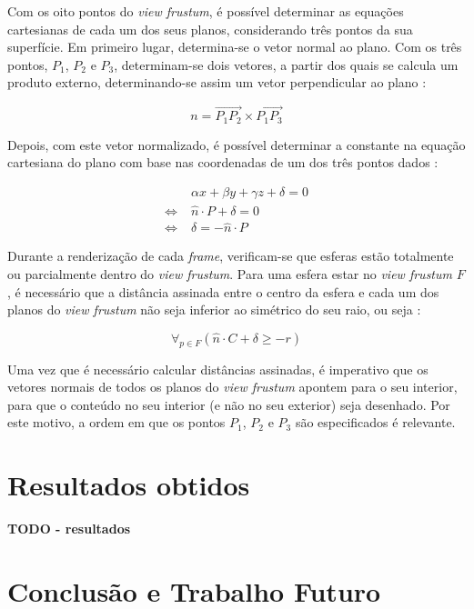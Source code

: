 \documentclass[12pt, a4paper]{article}
\begin{document}
Com os oito pontos do \emph{view frustum}, é possível determinar as equações cartesianas de cada
um dos seus planos, considerando três pontos da sua superfície. Em primeiro lugar, determina-se o
vetor normal ao plano. Com os três pontos, $P_1$, $P_2$ e $P_3$, determinam-se dois vetores, a
partir dos quais se calcula um produto externo, determinando-se assim um vetor perpendicular ao
plano \cite{lighthouse3d-plane}:

$$
n = \overrightarrow{P_1 P_2} \times \overrightarrow{P_1 P_3}
$$

Depois, com este vetor normalizado, é possível determinar a constante na equação cartesiana do plano
com base nas coordenadas de um dos três pontos dados \cite{lighthouse3d-plane}:

\begin{align*}
                       & \alpha x + \beta y + \gamma z + \delta = 0 \\
    \Leftrightarrow \; & \widehat{n} \cdot P + \delta = 0 \\
    \Leftrightarrow \; & \delta = -\widehat{n} \cdot P
\end{align*}

Durante a renderização de cada \emph{frame}, verificam-se que esferas estão totalmente ou
parcialmente dentro do \emph{view frustum}. Para uma esfera estar no \emph{view frustum} $F$, é
necessário que a distância assinada entre o centro da esfera e cada um dos planos do
\emph{view frustum} não seja inferior ao simétrico do seu raio, ou seja \cite{lighthouse3d-sphere}:

$$
\forall_{p \in F} \left ( \widehat{n} \cdot C + \delta \ge - r \right )
$$

Uma vez que é necessário calcular distâncias assinadas, é imperativo que os vetores normais de todos
os planos do \emph{view frustum} apontem para o seu interior, para que o conteúdo no seu interior (e
não no seu exterior) seja desenhado. \cite{lighthouse3d-frustum-planes} Por este motivo, a ordem em
que os pontos $P_1$, $P_2$ e $P_3$ são especificados é relevante.

\section{Resultados obtidos}

\textbf{\color{red} TODO - resultados}

\section{Conclusão e Trabalho Futuro}
\end{document}
